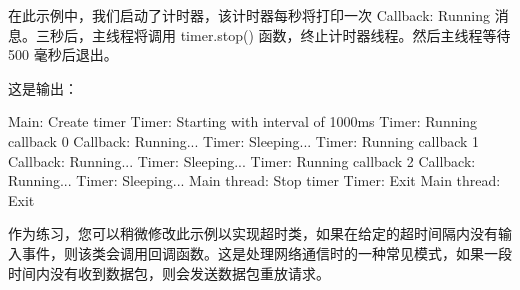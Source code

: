 在此示例中，我们启动了计时器，该计时器每秒将打印一次 Callback: Running 消息。三秒后，主线程将调用 timer.stop() 函数，终止计时器线程。然后主线程等待 500 毫秒后退出。

这是输出：

\begin{shell}
Main: Create timer
Timer: Starting with interval of 1000ms
Timer: Running callback 0
Callback: Running...
Timer: Sleeping...
Timer: Running callback 1
Callback: Running...
Timer: Sleeping...
Timer: Running callback 2
Callback: Running...
Timer: Sleeping...
Main thread: Stop timer
Timer: Exit
Main thread: Exit
\end{shell}

作为练习，您可以稍微修改此示例以实现超时类，如果在给定的超时间隔内没有输入事件，则该类会调用回调函数。这是处理网络通信时的一种常见模式，如果一段时间内没有收到数据包，则会发送数据包重放请求。























